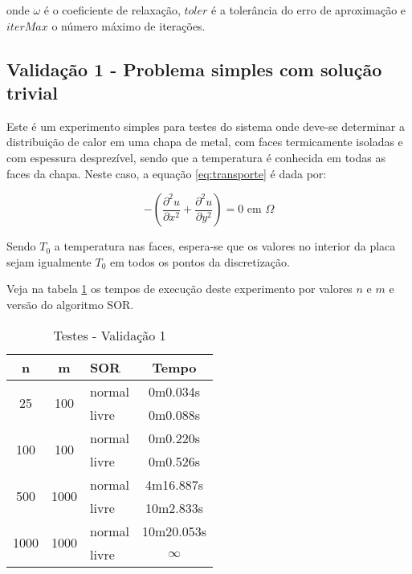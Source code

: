 \documentclass[
	11pt,				%
	oneside,			%
	a4paper,			%
	english,			%
	brazil,				%
	]{article}
\begin{document}
\noindent onde $\omega$ é o coeficiente de relaxação, $toler$ é a tolerância do 
erro de aproximação e $iterMax$ o número máximo de iterações.

\subsection{Validação 1 - Problema simples com solução trivial}
Este é um experimento simples para testes do sistema onde deve-se determinar a 
distribuição de calor em uma chapa de metal, com faces termicamente isoladas e 
com espessura desprezível, sendo que a temperatura é conhecida em todas as 
faces da chapa. Neste caso, a equação \eqref{eq:transporte} é dada por:

\begin{equation} \label{eq:v1}
- \left(\frac{\partial^2 u}{\partial x^2} + \frac{\partial^2 u}{\partial 
y^2}\right) = 0 \text{ em } \Omega
\end{equation}

Sendo $T_0$ a temperatura nas faces, espera-se que os valores no interior da 
placa sejam igualmente $T_0$ em todos os pontos da discretização.

Veja na tabela \ref{tab:tv1} os tempos de execução deste experimento por 
valores $n$ e $m$ e versão do algoritmo SOR.

\begin{table}[ht]
\centering
\begin{tabular}{|c|c|l|c|}
\hline 
\textbf{n} & \textbf{m} & \textbf{SOR} & \textbf{Tempo} \\
\hline
\multirow{2}{*}{25}    & \multirow{2}{*}{100}  & normal & 0m0.034s \\
                       &                       & livre  & 0m0.088s \\
\hline
\multirow{2}{*}{100}   & \multirow{2}{*}{100}  & normal & 0m0.220s \\
                       &                       & livre  & 0m0.526s \\
\hline
\multirow{2}{*}{500}   & \multirow{2}{*}{1000} & normal & 4m16.887s \\
                       &                       & livre  & 10m2.833s \\
\hline
\multirow{2}{*}{1000}  & \multirow{2}{*}{1000} & normal & 10m20.053s \\
                       &                       & livre  & $\infty$ \\
\hline
\end{tabular}
\caption{Testes - Validação 1}
\label{tab:tv1}
\end{table}
\end{document}
